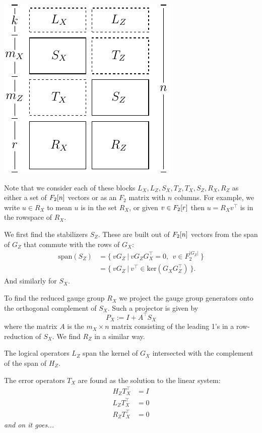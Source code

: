 \documentclass[12pt]{article}
\begin{document}
\def\Im{\mathrm{im}}
\def\Ker{\mathrm{ker}}
\def\Span{\mathrm{span}}
\begin{center}
\includegraphics[]{pic-symplectic.pdf}
\end{center}

Note that we consider each of these blocks 
$L_X, L_Z, S_X, T_Z, T_X, S_Z, R_X, R_Z$
as either a set of $F_2[n]$ vectors or as an $F_2$ matrix
with $n$ columns.
For example, we write $u\in R_X$ to mean $u$ is in
the set $R_X$, or given $v\in F_2[r]$ then $u = R_X v^\top$ is
in the rowspace of $R_X.$

We first find the stabilizers $S_Z$.
These are built out of $F_2[n]$ vectors from the span of $G_Z$
that commute with the rows of $G_X:$
\begin{align*}
    \Span(S_Z) &= \{\  vG_Z \ |\  v G_Z G_X^\top = 0, \ \ v \in F_2^{|G_Z|}\ \} \\
               &= \{\  vG_Z \ |\  v^\top \in \Ker(G_X G_Z^\top)  \ \}.
\end{align*}
And similarly for $S_X.$

To find the reduced gauge group $R_X$ we project the gauge
group generators onto the orthogonal complement of $S_X.$
Such a projector is given by
$$
    P_X := I + A^\top S_X
$$
where the matrix $A$ is the $m_X\times n$ matrix consisting of
the leading 1's in a row-reduction of $S_X.$
We find $R_Z$ in a similar way.

The logical operators $L_Z$ 
span the kernel of $G_X$ intersected with the complement
of the span of $H_Z.$

The error operators $T_X$ are found as the solution
to the linear system:
\begin{align*}
    H_Z T_X^\top &= I \\
    L_Z T_X^\top &= 0 \\
    R_Z T_X^\top &= 0
\end{align*}
\emph{and on it goes...}
\end{document}
